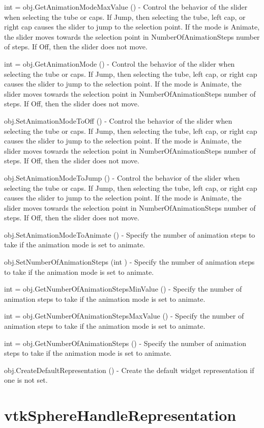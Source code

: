 \begin{DoxyItemize}
\item {\ttfamily int = obj.\-Get\-Animation\-Mode\-Max\-Value ()} -\/ Control the behavior of the slider when selecting the tube or caps. If Jump, then selecting the tube, left cap, or right cap causes the slider to jump to the selection point. If the mode is Animate, the slider moves towards the selection point in Number\-Of\-Animation\-Steps number of steps. If Off, then the slider does not move.  
\item {\ttfamily int = obj.\-Get\-Animation\-Mode ()} -\/ Control the behavior of the slider when selecting the tube or caps. If Jump, then selecting the tube, left cap, or right cap causes the slider to jump to the selection point. If the mode is Animate, the slider moves towards the selection point in Number\-Of\-Animation\-Steps number of steps. If Off, then the slider does not move.  
\item {\ttfamily obj.\-Set\-Animation\-Mode\-To\-Off ()} -\/ Control the behavior of the slider when selecting the tube or caps. If Jump, then selecting the tube, left cap, or right cap causes the slider to jump to the selection point. If the mode is Animate, the slider moves towards the selection point in Number\-Of\-Animation\-Steps number of steps. If Off, then the slider does not move.  
\item {\ttfamily obj.\-Set\-Animation\-Mode\-To\-Jump ()} -\/ Control the behavior of the slider when selecting the tube or caps. If Jump, then selecting the tube, left cap, or right cap causes the slider to jump to the selection point. If the mode is Animate, the slider moves towards the selection point in Number\-Of\-Animation\-Steps number of steps. If Off, then the slider does not move.  
\item {\ttfamily obj.\-Set\-Animation\-Mode\-To\-Animate ()} -\/ Specify the number of animation steps to take if the animation mode is set to animate.  
\item {\ttfamily obj.\-Set\-Number\-Of\-Animation\-Steps (int )} -\/ Specify the number of animation steps to take if the animation mode is set to animate.  
\item {\ttfamily int = obj.\-Get\-Number\-Of\-Animation\-Steps\-Min\-Value ()} -\/ Specify the number of animation steps to take if the animation mode is set to animate.  
\item {\ttfamily int = obj.\-Get\-Number\-Of\-Animation\-Steps\-Max\-Value ()} -\/ Specify the number of animation steps to take if the animation mode is set to animate.  
\item {\ttfamily int = obj.\-Get\-Number\-Of\-Animation\-Steps ()} -\/ Specify the number of animation steps to take if the animation mode is set to animate.  
\item {\ttfamily obj.\-Create\-Default\-Representation ()} -\/ Create the default widget representation if one is not set.  
\end{DoxyItemize}\hypertarget{vtkwidgets_vtkspherehandlerepresentation}{}\section{vtk\-Sphere\-Handle\-Representation}\label{vtkwidgets_vtkspherehandlerepresentation}
